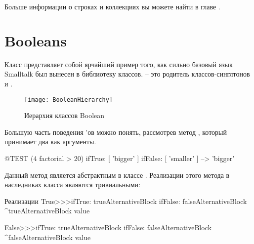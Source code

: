 \documentclass[a4paper,10pt,twoside]{book}
\begin{document}
Больше информации о строках и коллекциях вы можете найти в главе .


\section{Booleans}


Класс  представляет собой ярчайший пример того, как сильно базовый язык Smalltalk был вынесен в библиотеку классов.  -- это  родитель классов-синглтонов  и .

\begin{figure}[ht]
	{\centerline {\texttt{[image: BooleanHierarchy]}}}
\caption{Иерархия классов Boolean }
\end{figure}

Большую часть поведения 'ов можно понять, рассмотрев метод , который принимает два  как аргументы.

\begin{code}{@TEST}
(4 factorial > 20) ifTrue: [ 'bigger' ] ifFalse: [ 'smaller' ] --> 'bigger'
\end{code}

Данный метод является абстрактным в классе .
Реализации этого метода в наследниках класса являются тривиальными:

\begin{method}{Реализации }
True>>>ifTrue: trueAlternativeBlock ifFalse: falseAlternativeBlock 
    ^trueAlternativeBlock value

False>>>ifTrue: trueAlternativeBlock ifFalse: falseAlternativeBlock 
    ^falseAlternativeBlock value
\end{method}
\end{document}
